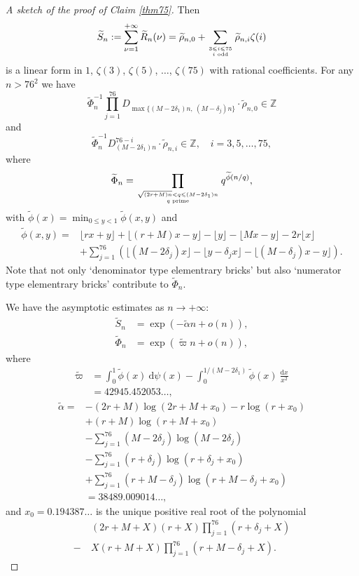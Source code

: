 \documentclass[12pt]{article}
\numberwithin{equation}{section}
\begin{document}
\begin{proof}[A sketch of the proof of Claim \ref{thm75}]
Then 
\[ \widetilde{S}_n := \sum_{\nu=1}^{+\infty} \widetilde{R}_n(\nu) = \widetilde{\rho}_{n,0} + \sum_{3 \leqslant i \leqslant 75 \atop i \text{~odd}} \widetilde{\rho}_{n,i}\zeta(i)   \]
is a linear form in $1$, $\zeta(3)$, $\zeta(5)$, $\ldots$, $\zeta(75)$ with rational coefficients. For any $n>76^2$ we have
\[ \widetilde{\Phi}_n^{-1} \prod_{j=1}^{76} D_{\max\{ (M-2\delta_1)n,~(M-\delta_j)n \}} \cdot \widetilde{\rho}_{n,0} \in \mathbb{Z} \]
and
\[ \widetilde{\Phi}_n^{-1}D_{(M-2\delta_1)n}^{76-i} \cdot \widetilde{\rho}_{n,i} \in \mathbb{Z}, \quad i=3,5,\ldots,75, \]
where
\[ \widetilde{\Phi}_{n} = \prod_{\sqrt{(2r+M)n} < q \leqslant (M-2\delta_1)n \atop q \text{~prime}} q^{\widetilde{\phi}(n/q)}, \]
with $\widetilde{\phi}(x) = \min_{0 \leqslant y < 1} \widetilde{\phi}(x,y)$ and
\begin{align*}
\widetilde{\phi}(x,y) =& \lfloor  rx+y \rfloor + \lfloor  (r+M)x - y \rfloor - \lfloor  y \rfloor - \lfloor  Mx-y \rfloor -2r\lfloor  x \rfloor \\
&+ \sum_{j=1}^{76} \left( \lfloor  (M-2\delta_j)x \rfloor - \lfloor  y-\delta_j x \rfloor - \lfloor  (M-\delta_j)x - y \rfloor \right). 
\end{align*}
Note that not only `denominator type elementrary bricks' but also `numerator type elementrary bricks' contribute to $\widetilde{\Phi}_n$.

We have the asymptotic estimates as $n \to +\infty$: 
\begin{align*}
\widetilde{S}_n &= \exp\left( -\widetilde{\alpha} n + o(n) \right), \\
\widetilde{\Phi}_n &= \exp\left( \widetilde{\varpi}n +o(n) \right), 
\end{align*}
where
\begin{align*}
	\widetilde{\varpi} &= \int_{0}^{1} \widetilde{\phi}(x)~\mathrm{d}\psi(x) - \int_{0}^{1/(M-2\delta_1)} \widetilde{\phi}(x)~\frac{\mathrm{d}x}{x^2} \\
	&= 42945.452053\ldots,
\end{align*}
\begin{align*}
\widetilde{\alpha} = 
&- (2r+M)\log\left( 2r+M + x_0 \right) - r\log(r+x_0) \\
&+ (r+M)\log(r+M+x_0) \\
&- \sum_{j=1}^{76} (M-2\delta_j)\log(M-2\delta_j)  \\
&- \sum_{j=1}^{76} (r+\delta_j)\log(r+\delta_j+x_0) \\
&+ \sum_{j=1}^{76} (r+M-\delta_j)\log(r+M-\delta_j+x_0)  \\
&= 38489.009014\ldots,
\end{align*}
and $x_0 = 0.194387\ldots$ is the unique positive real root of the polynomial
\begin{align*}
&~(2r+M+X)(r+X)\prod_{j=1}^{76}(r+\delta_j+X) \\
-&~ X(r+M+X)\prod_{j=1}^{76}(r+M-\delta_j+X).  
\end{align*}



\end{proof}
\end{document}
